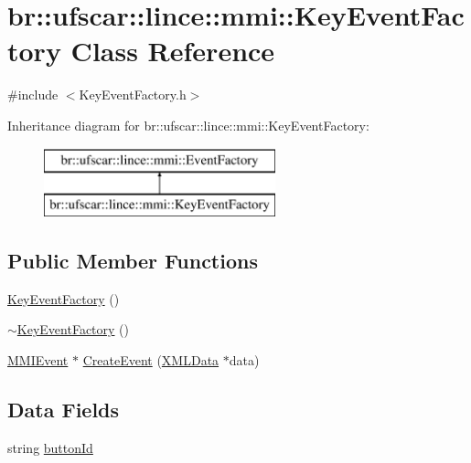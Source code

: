 \hypertarget{classbr_1_1ufscar_1_1lince_1_1mmi_1_1KeyEventFactory}{
\section{br::ufscar::lince::mmi::KeyEventFactory Class Reference}
\label{classbr_1_1ufscar_1_1lince_1_1mmi_1_1KeyEventFactory}
}


{\ttfamily \#include $<$KeyEventFactory.h$>$}

Inheritance diagram for br::ufscar::lince::mmi::KeyEventFactory:\begin{figure}[H]
\begin{center}
\leavevmode
\includegraphics[height=2cm]{classbr_1_1ufscar_1_1lince_1_1mmi_1_1KeyEventFactory}
\end{center}
\end{figure}
\subsection*{Public Member Functions}
\begin{DoxyCompactItemize}
\item 
\hyperlink{classbr_1_1ufscar_1_1lince_1_1mmi_1_1KeyEventFactory_ab4158dc9066513f282ee670c3f98d716}{KeyEventFactory} ()
\item 
\hyperlink{classbr_1_1ufscar_1_1lince_1_1mmi_1_1KeyEventFactory_afbe72c85a1c20525aa60055b4de36f12}{$\sim$KeyEventFactory} ()
\item 
\hyperlink{classbr_1_1ufscar_1_1lince_1_1mmi_1_1MMIEvent}{MMIEvent} $\ast$ \hyperlink{classbr_1_1ufscar_1_1lince_1_1mmi_1_1KeyEventFactory_a838221bf5491967315a7475691e72103}{CreateEvent} (\hyperlink{structbr_1_1ufscar_1_1lince_1_1mmi_1_1XMLData}{XMLData} $\ast$data)
\end{DoxyCompactItemize}
\subsection*{Data Fields}
\begin{DoxyCompactItemize}
\item 
string \hyperlink{classbr_1_1ufscar_1_1lince_1_1mmi_1_1KeyEventFactory_a34a7fe739dd5ed97ee418df3c99c2e2c}{buttonId}
\end{DoxyCompactItemize}


